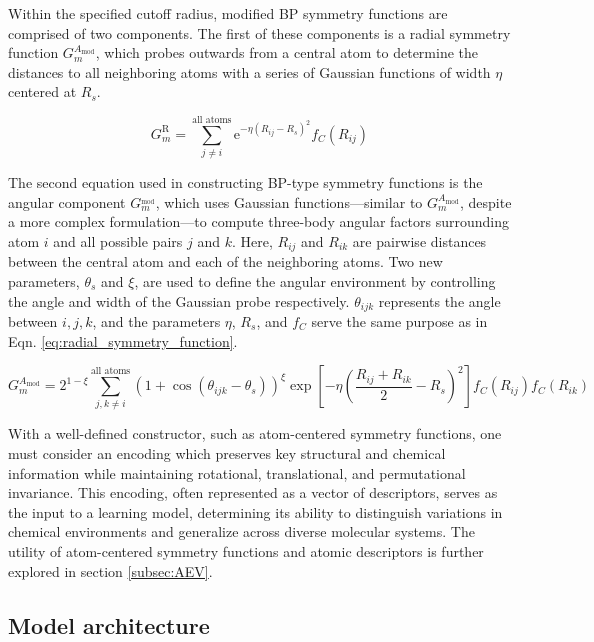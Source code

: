 Within the specified cutoff radius, modified BP symmetry functions are comprised of two components. 
The first of these components is a radial symmetry function $G^{A_{\text{mod}}}_m$, which probes outwards from a central atom to determine the distances to all neighboring atoms with a series of Gaussian functions of width $\eta$ centered at $R_s$.

\begin{equation}
  G_{m}^{\text{R}} = \sum_{j \neq i}^{\text{all atoms}} \mathrm{e}^{-\eta (R_{ij} - R_{s})^2} f_{C}(R_{ij})
  \label{eq:radial_symmetry_function}
\end{equation}

The second equation used in constructing BP-type symmetry functions is the angular component $G^{_{\text{mod}}}_m$, which uses Gaussian functions---similar to $G^{A_{\text{mod}}}_m$, despite a more complex formulation---to compute three-body angular factors surrounding atom $i$ and all possible pairs $j$ and $k$. 
Here, $R_{ij}$ and $R_{ik}$ are pairwise distances between the central atom and each of the neighboring atoms. 
Two new parameters, $\theta_{s}$ and $\xi$, are used to define the angular environment by controlling the angle and width of the Gaussian probe respectively. 
$\theta_{ijk}$ represents the angle between $i,j,k$, and the parameters $\eta$, $R_s$, and $f_C$ serve the same purpose as in Eqn. \ref{eq:radial_symmetry_function}.

\begin{equation}
    G^{A_{\text{mod}}}_m = 2^{1-\xi} \sum_{j,k \neq i}^{\text{all atoms}} \left( 1 + \cos(\theta_{ijk} - \theta_s) \right)^\xi \exp \left[ -\eta \left( \frac{R_{ij} + R_{ik}}{2} - R_s \right)^2 \right] f_C(R_{ij}) f_C(R_{ik})
    \label{eq:angular_symmetry_function}
\end{equation}

With a well-defined constructor, such as atom-centered symmetry functions, one must consider an encoding which preserves key structural and chemical information while maintaining rotational, translational, and permutational invariance.
This encoding, often represented as a vector of descriptors, serves as the input to a learning model, determining its ability to distinguish variations in chemical environments and generalize across diverse molecular systems.
The utility of atom-centered symmetry functions and atomic descriptors is further explored in section \ref{subsec:AEV}.


\subsection{Model architecture}
\label{subsec:ML_model_architecture}

